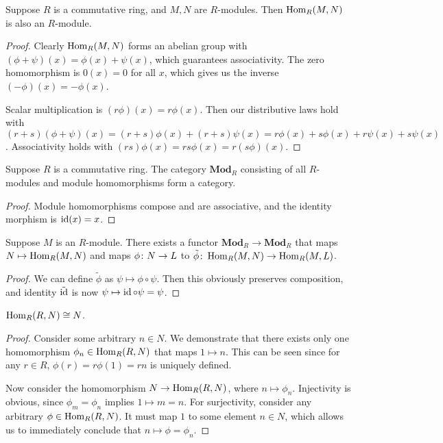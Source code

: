 \begin{proposition}
    Suppose \(R\) is a commutative ring, and \(M,N\) are \(R\)-modules.
    Then \(\operatorname{Hom}_R(M,N)\) is also an \(R\)-module.
\end{proposition}
\begin{proof}
    Clearly \(\operatorname{Hom}_R(M,N)\) forms an abelian group with
    \((\phi+\psi)(x) = \phi(x)+\psi(x)\),
    which guarantees associativity.
    The zero homomorphism is \(0(x) = 0\) for all \(x\),
    which gives us the inverse \((-\phi)(x) = -\phi(x)\).

    Scalar multiplication is \((r\phi)(x) = r\phi(x)\).
    Then our distributive laws hold with
    \((r+s)(\phi+\psi)(x) = (r+s)\phi(x) + (r+s)\psi(x) = r\phi(x) + s\phi(x) + r\psi(x) + s\psi(x)\).
    Associativity holds with \((rs)\phi(x) = rs\phi(x) = r(s\phi)(x)\).
\end{proof}
\begin{proposition}
    Suppose \(R\) is a commutative ring.
    The category \(\textbf{Mod}_R\) consisting of all \(R\)-modules
    and module homomorphisms form a category.
\end{proposition}
\begin{proof}
    Module homomorphisms compose and are associative,
    and the identity morphism is \(\operatorname{id}(x) = x\).
\end{proof}
\begin{proposition}
    Suppose \(M\) is an \(R\)-module.
    There exists a functor \(\textbf{Mod}_R \to \textbf{Mod}_R\)
    that maps \(N \mapsto \operatorname{Hom}_R(M,N)\)
    and maps \(\phi\colon N\to L\) to \(\tilde{\phi}\colon\operatorname{Hom}_R(M,N)\to\operatorname{Hom}_R(M,L)\).
\end{proposition}
\begin{proof}
    We can define \(\tilde{\phi}\) as \(\psi \mapsto \phi\circ\psi\).
    Then this obviously preserves composition,
    and identity \(\tilde{\operatorname{id}}\) is now \(\psi \mapsto \operatorname{id}\circ\psi = \psi\).
\end{proof}
\begin{proposition}
    \(\operatorname{Hom}_R(R,N) \cong N\).
\end{proposition}
\begin{proof}
    Consider some arbitrary \(n \in N\).
    We demonstrate that there exists only one homomorphism \(\phi_n \in \operatorname{Hom}_R(R,N)\)
    that maps \(1 \mapsto n\).
    This can be seen since for any \(r \in R\),
    \(\phi(r) = r\phi(1) = rn\) is uniquely defined.

    Now consider the homomorphism \(N \to \operatorname{Hom}_R(R,N)\),
    where \(n \mapsto \phi_n\).
    Injectivity is obvious, since \(\phi_m = \phi_n\) implies \(1 \mapsto m = n\).
    For surjectivity, consider any arbitrary \(\phi \in \operatorname{Hom}_R(R,N)\).
    It must map \(1\) to some element \(n \in N\),
    which allows us to immediately conclude that \(n \mapsto \phi = \phi_n\).
\end{proof}

